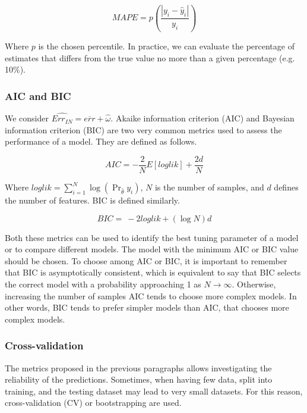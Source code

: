 \begin{equation}
MAPE=p\left(\frac{\left|y_i-{\hat{y}}_i\right|}{y_i}\right)
\label{eq_MAPE}
\end{equation}

Where $p$ is the chosen percentile. In practice, we can evaluate the percentage of estimates that differs from the true value no more than a given percentage (e.g. 10\%).

\subsubsection{AIC and BIC}

We consider $\widehat{Err_{IN}}=\overline{err}+\hat{\omega}$. Akaike information criterion (AIC) and Bayesian information criterion (BIC) are two very common metrics used to assess the performance of a model. They are defined as follows.

\begin{equation}
AIC=-\frac{2}{N}E\left[loglik\right]+\frac{2d}{N}
\label{eq_AIC}
\end{equation}

Where $loglik=\sum_{i=1}^{N}{\log(\Pr_{\hat{\theta}}{y_i})}$, $N$ is the number of samples, and $d$ defines the number of features. BIC is defined similarly.

\begin{equation}
BIC=\ -2loglik+(\log{N})d
\label{eq_BIC}
\end{equation}

Both these metrics can be used to identify the best tuning parameter of a model or to compare different models. The model with the minimum AIC or BIC value should be chosen. To choose among AIC or BIC, it is important to remember that BIC is asymptotically consistent, which is equivalent to say that BIC selects the correct model with a probability approaching 1 as $N\rightarrow\infty$. Otherwise, increasing the number of samples AIC tends to choose more complex models. In other words, BIC tends to prefer simpler models than AIC, that chooses more complex models.

\subsubsection{Cross-validation}
The metrics proposed in the previous paragraphs allows investigating the reliability of the predictions. Sometimes, when having few data, split into training, and the testing dataset may lead to very small datasets. For this reason, cross-validation (CV) or bootstrapping are used.\par

